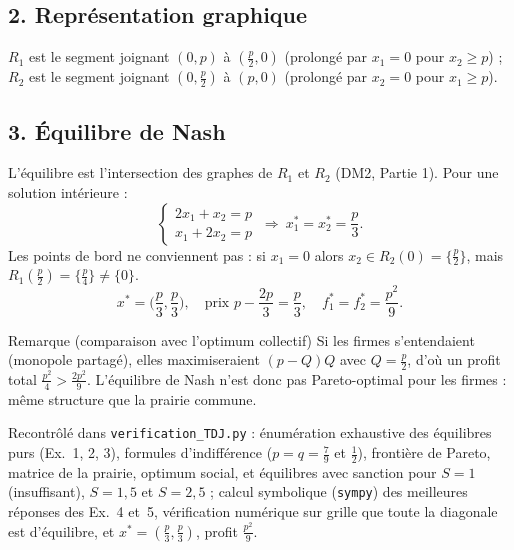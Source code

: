 \documentclass[11pt,a4paper]{article}
\begin{document}
\subsection*{2. Représentation graphique}
\begin{center}
\end{center}
$R_1$ est le segment joignant $(0,p)$ à $(\frac p2,0)$ (prolongé par $x_1=0$ pour $x_2\ge p$) ; $R_2$ est le segment joignant $(0,\frac p2)$ à $(p,0)$ (prolongé par $x_2=0$ pour $x_1\ge p$).

\subsection*{3. Équilibre de Nash}
L'équilibre est l'intersection des graphes de $R_1$ et $R_2$ (DM2, Partie 1). Pour une solution intérieure :
\[
\begin{cases}2x_1+x_2=p\\ x_1+2x_2=p\end{cases}\ \Rightarrow\ x_1^*=x_2^*=\frac p3.
\]
Les points de bord ne conviennent pas : si $x_1=0$ alors $x_2\in R_2(0)=\{\frac p2\}$, mais $R_1(\frac p2)=\{\frac p4\}\ne\{0\}$.
\[
\boxed{x^*=\Big(\frac p3,\frac p3\Big),\quad \text{prix } p-\frac{2p}{3}=\frac p3,\quad f_1^*=f_2^*=\frac{p^2}{9}.}
\]
\begin{rembox}{Remarque (comparaison avec l'optimum collectif)}
Si les firmes s'entendaient (monopole partagé), elles maximiseraient $(p-Q)Q$ avec $Q=\frac p2$, d'où un profit total $\frac{p^2}{4}>\frac{2p^2}{9}$. L'équilibre de Nash n'est donc pas Pareto-optimal pour les firmes : même structure que la prairie commune.
\end{rembox}

\vspace{0.4cm}
\begin{verifbox}
Recontrôlé dans \texttt{verification\_TDJ.py} : énumération exhaustive des équilibres purs (Ex.~1, 2, 3), formules d'indifférence ($p=q=\frac79$ et $\frac12$), frontière de Pareto, matrice de la prairie, optimum social, et équilibres avec sanction pour $S=1$ (insuffisant), $S=1{,}5$ et $S=2{,}5$ ; calcul symbolique (\texttt{sympy}) des meilleures réponses des Ex.~4 et~5, vérification numérique sur grille que toute la diagonale est d'équilibre, et $x^*=(\frac p3,\frac p3)$, profit $\frac{p^2}{9}$.
\end{verifbox}
\end{document}

